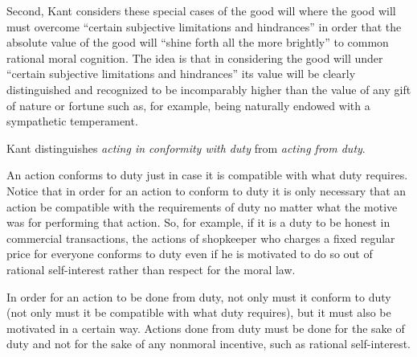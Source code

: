 Second, Kant considers these special cases of the good will where the good will must overcome ``certain subjective limitations and hindrances'' in order that the absolute value of the good will ``shine forth all the more brightly'' to common rational moral cognition. The idea is that in considering the good will under ``certain subjective limitations and hindrances'' its value will be clearly distinguished and recognized to be incomparably higher than the value of any gift of nature or fortune such as, for example, being naturally endowed with a sympathetic temperament.

Kant distinguishes \emph{acting in conformity with duty} from \emph{acting from duty}.

An action conforms to duty just in case it is compatible with what duty requires. Notice that in order for an action to conform to duty it is only necessary that an action be compatible with the requirements of duty no matter what the motive was for performing that action. So, for example, if it is a duty to be honest in commercial transactions, the actions of shopkeeper who charges a fixed regular price for everyone conforms to duty even if he is motivated to do so out of rational self-interest rather than respect for the moral law.

In order for an action to be done from duty, not only must it conform to duty (not only must it be compatible with what duty requires), but it must also be motivated in a certain way. Actions done from duty must be done for the sake of duty and not for the sake of any nonmoral incentive, such as rational self-interest. \change

% 

